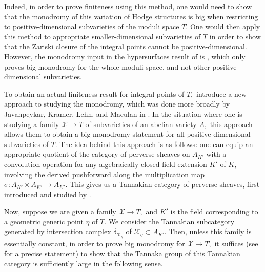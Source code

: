 \documentclass{article}
\theoremstyle{definition}
\theoremstyle{remark}
\begin{document}
\par Indeed, in order to prove finiteness using this method, one would need to show that the monodromy of this variation of Hodge structures is big when restricting to positive-dimensional subvarieties of the moduli space $T.$ One would then apply this method to appropriate smaller-dimensional subvarieties of $T$ in order to show that the Zariski closure of the integral points cannot be positive-dimensional. However, the monodromy input in the hypersurfaces result of \cite{lv18} is \cite{beauville}, which only proves big monodromy for the whole moduli space, and not other positive-dimensional subvarieties.
\par To obtain an actual finiteness result for integral points of $T,$ \cite{ls25} introduce a new approach to studying the monodromy, which was done more broadly by Javanpeykar, Kramer, Lehn, and Maculan in \cite{jklm23}. In the situation where one is studying a family $\mathcal{X} \rightarrow T$ of subvarieties of an abelian variety $A,$ this approach allows them to obtain a big monodromy statement for all positive-dimensional subvarieties of $T.$ The idea behind this approach is as follows: one can equip an appropriate quotient of the category of perverse sheaves on $A_{K'}$ with a convolution operation for any algebraically closed field extension $K'$ of $K,$ involving the derived pushforward along the multiplication map $\sigma: A_{K'} \times A_{K'} \rightarrow A_{K'}.$ This gives us a Tannakian category of perverse sheaves, first introduced and studied by \cite{kram2015}. 
\par Now, suppose we are given a family $\mathcal{X} \rightarrow T,$ and $K'$ is the field corresponding to a geometric generic point $\overline{\eta}$ of $T.$ We consider the Tannakian subcategory generated by intersection complex $\delta_{\mathcal{X}_{\overline{\eta}}}$ of $\mathcal{X}_{\overline{\eta}} \subset A_{K'}.$ Then, unless this family is essentially constant, in order to prove big monodromy for $\mathcal{X} \rightarrow T,$ it suffices (see \cite[Theorem 4.10]{jklm23} for a precise statement) to show that the Tannaka group of this Tannakian category is sufficiently large in the following sense.
\end{document}
